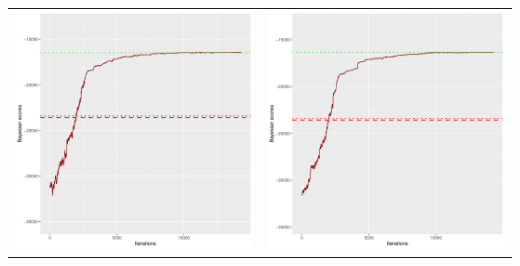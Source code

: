 \documentclass[]{scrartcl}
\begin{document}
\begin{table}[h!]
\begin{tabular}{cc}
\includegraphics[scale = 0.4]{./figs/win95pts/v4/25/bayBoundsEvolution-14252.pdf} & 
\includegraphics[scale = 0.4]{./figs/win95pts/v4/50/bayBoundsEvolution-14252.pdf} \\

\end{tabular}
\end{table}
\end{document}
